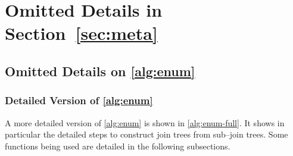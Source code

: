 
\section{Omitted Details in Section~\ref{sec:meta}}
\label{app:meta}

\subsection{Omitted Details on \cref{alg:enum}}
\label{app:enum}

\subsubsection{Detailed Version of \cref{alg:enum}}
A more detailed version of \cref{alg:enum} is shown in \cref{alg:enum-full}. It shows in particular the detailed steps to construct join trees from sub--join trees. Some functions being used are detailed in the following subsections.

